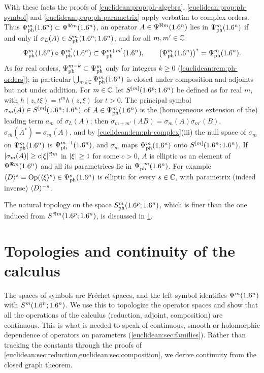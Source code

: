 With these facts the proofs of \cref{euclidean:prop:ph-algebra},
\cref{euclidean:prop:ph-symbol} and \cref{euclidean:prop:ph-parametrix} apply
verbatim to complex orders. Thus
$\Psi^{m}_{\mathrm{ph}}(1.6^n)\subset\Psi^{\Re m}(1.6^n)$, an operator
$A\in\Psi^{\Re m}(1.6^n)$ lies in $\Psi^{m}_{\mathrm{ph}}(1.6^n)$ if and only if
$\sigma_L(A)\in S^{m}_{\mathrm{ph}}(1.6^n;1.6^n)$, and for all $m,m'\in\mathbb{C}$
\begin{equation*}
  \Psi^{m}_{\mathrm{ph}}(1.6^n)\circ\Psi^{m'}_{\mathrm{ph}}(1.6^n)\subset
  \Psi^{m+m'}_{\mathrm{ph}}(1.6^n),\qquad
  \bigl(\Psi^{m}_{\mathrm{ph}}(1.6^n)\bigr)^*=\Psi^{\bar m}_{\mathrm{ph}}(1.6^n).
\end{equation*}
As for real orders, $\Psi^{m-k}_{\mathrm{ph}}\subset\Psi^{m}_{\mathrm{ph}}$ only
for integers $k\ge0$ (\cref{euclidean:rem:ph-orders}); in particular
$\bigcup_{m\in\mathbb{C}}\Psi^{m}_{\mathrm{ph}}(1.6^n)$ is closed under composition and
adjoints but not under addition. For $m\in\mathbb{C}$ let $S^{[m]}(1.6^p;1.6^n)$ be defined as
for real $m$, with $h(z,t\xi)=t^mh(z,\xi)$ for $t>0$. The principal symbol
$\sigma_m(A)\in S^{[m]}(1.6^n;1.6^n)$ of $A\in\Psi^{m}_{\mathrm{ph}}(1.6^n)$ is
the (homogeneous extension of the) leading term $a_m$ of $\sigma_L(A)$; then $\sigma_{m+m'}(AB)=\sigma_m(A)\sigma_{m'}(B)$,
$\sigma_{\bar m}(A^*)=\overline{\sigma_m(A)}$, and by
\cref{euclidean:lem:ph-complex}(iii) the null space of $\sigma_m$ on
$\Psi^{m}_{\mathrm{ph}}(1.6^n)$ is $\Psi^{m-1}_{\mathrm{ph}}(1.6^n)$, and $\sigma_m$ maps
$\Psi^{m}_{\mathrm{ph}}(1.6^n)$ onto $S^{[m]}(1.6^n;1.6^n)$. If
$\lvert \sigma_m(A)\rvert\ge c\lvert \xi\rvert^{\Re m}$ in $\lvert \xi\rvert\ge1$ for some $c>0$, $A$ is
elliptic as an element of $\Psi^{\Re m}(1.6^n)$ and all its parametrices
lie in $\Psi^{-m}_{\mathrm{ph}}(1.6^n)$. For example
$\langle D\rangle^s=\operatorname{Op}(\langle \xi\rangle^s)\in\Psi^{s}_{\mathrm{ph}}(1.6^n)$ is elliptic for every
$s\in\mathbb{C}$, with parametrix (indeed inverse) $\langle D\rangle^{-s}$.

The natural topology on the space $S^{m}_{\mathrm{ph}}(1.6^p;1.6^n)$, which is finer
than the one induced from $S^{\Re m}(1.6^p;1.6^n)$, is discussed in
\cref{euclidean:sec:topology}.

\section{Topologies and continuity of the calculus}\label{euclidean:sec:topology}

The spaces of symbols are Fr\'echet spaces, and the left symbol identifies
$\Psi^{m}(1.6^n)$ with $S^m(1.6^n;1.6^n)$. We use this to topologize the
operator spaces and show that all the operations of the calculus (reduction,
adjoint, composition) are continuous. This is what is needed to speak of
continuous, smooth or holomorphic dependence of operators on parameters
(\cref{euclidean:sec:families}). Rather than tracking the constants through
the proofs of \cref{euclidean:sec:reduction,euclidean:sec:composition}, we
derive continuity from the closed graph theorem.

